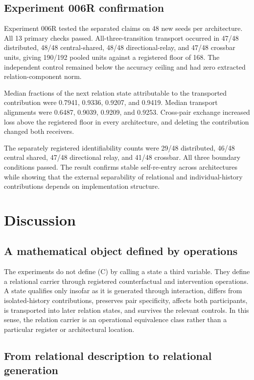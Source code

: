 \documentclass[11pt,a4paper]{article}
\begin{document}
\subsection{Experiment 006R confirmation}

Experiment 006R tested the separated claims on 48 new seeds per architecture. All 13 primary checks passed. All-three-transition transport occurred in 47/48 distributed, 48/48 central-shared, 48/48 directional-relay, and 47/48 crossbar units, giving 190/192 pooled units against a registered floor of 168. The independent control remained below the accuracy ceiling and had zero extracted relation-component norm.

Median fractions of the next relation state attributable to the transported contribution were 0.7941, 0.9336, 0.9207, and 0.9419. Median transport alignments were 0.6487, 0.9039, 0.9209, and 0.9253. Cross-pair exchange increased loss above the registered floor in every architecture, and deleting the contribution changed both receivers.

The separately registered identifiability counts were 29/48 distributed, 46/48 central shared, 47/48 directional relay, and 41/48 crossbar. All three boundary conditions passed. The result confirms stable self-re-entry across architectures while showing that the external separability of relational and individual-history contributions depends on implementation structure.

\section{Discussion}

\subsection{A mathematical object defined by operations}

The experiments do not define (C) by calling a state a third variable. They define a relational carrier through registered counterfactual and intervention operations. A state qualifies only insofar as it is generated through interaction, differs from isolated-history contributions, preserves pair specificity, affects both participants, is transported into later relation states, and survives the relevant controls. In this sense, the relation carrier is an operational equivalence class rather than a particular register or architectural location.

\subsection{From relational description to relational generation}
\end{document}
